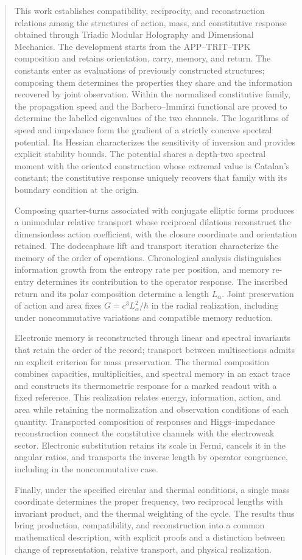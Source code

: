 \begin{abstract}
This work establishes compatibility, reciprocity, and reconstruction
relations among the structures of action, mass, and constitutive response
obtained through Triadic Modular Holography and Dimensional Mechanics.
The development starts from the APP--TRIT--TPK composition and retains
orientation, carry, memory, and return. The constants enter as evaluations
of previously constructed structures; composing them determines the
properties they share and the information recovered by joint observation.
Within the normalized constitutive family, the propagation speed and the
Barbero--Immirzi functional are proved to determine the labelled
eigenvalues of the two channels. The logarithms of speed and impedance
form the gradient of a strictly concave spectral potential. Its Hessian
characterizes the sensitivity of inversion and provides explicit stability
bounds. The potential shares a depth-two spectral moment with the oriented
construction whose extremal value is Catalan's constant; the constitutive
response uniquely recovers that family with its boundary condition at
the origin.

Composing quarter-turns associated with conjugate elliptic forms produces
a unimodular relative transport whose reciprocal dilations reconstruct the
dimensionless action coefficient, with the closure coordinate and
orientation retained. The dodecaphase lift and transport iteration
characterize the memory of the order of operations. Chronological analysis
distinguishes information growth from the entropy rate per position, and
memory re-entry determines its contribution to the operator response.
The inscribed return and its polar composition determine a length
$L_\alpha$. Joint preservation of action and area fixes
$G=c^3L_\alpha^2/\hbar$ in the radial realization, including under
noncommutative variations and compatible memory reduction.

Electronic memory is reconstructed through linear and spectral invariants
that retain the order of the record; transport between multisections
admits an explicit criterion for mass preservation. The thermal
composition combines capacities, multiplicities, and spectral memory in
an exact trace and constructs its thermometric response for a marked
readout with a fixed reference. This realization relates energy,
information, action, and area while retaining the normalization and
observation conditions of each quantity.
Transported composition of responses and Higgs--impedance reconstruction
connect the constitutive channels with the electroweak sector. Electronic
substitution retains its scale in Fermi, cancels it in the angular ratios,
and transports the inverse length by operator congruence, including in
the noncommutative case.

Finally, under the specified circular and thermal conditions, a single
mass coordinate determines the proper frequency, two reciprocal lengths
with invariant product, and the thermal weighting of the cycle. The
results thus bring production, compatibility, and reconstruction into a
common mathematical description, with explicit proofs and a distinction
between change of representation, relative transport, and physical
realization.
\end{abstract}

